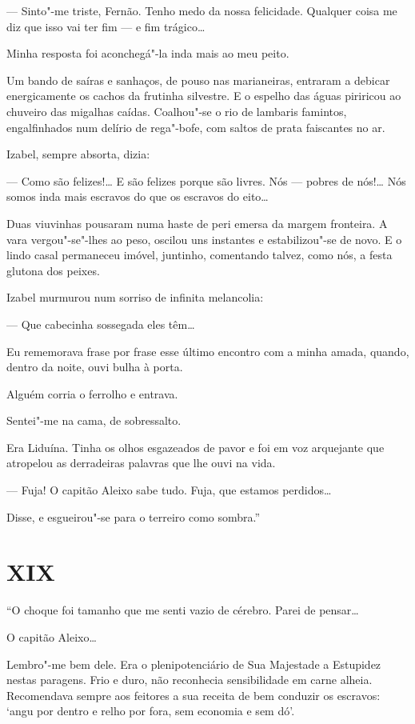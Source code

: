 --- Sinto"-me triste, Fernão. Tenho medo da nossa felicidade. Qualquer
coisa me diz que isso vai ter fim --- e fim trágico\ldots{}

Minha resposta foi aconchegá"-la inda mais ao meu peito.

Um bando de saíras e sanhaços, de pouso nas marianeiras, entraram a
debicar energicamente os cachos da frutinha silvestre. E o espelho das
águas piriricou ao chuveiro das migalhas caídas. Coalhou"-se o rio de
lambaris famintos, engalfinhados num delírio de rega"-bofe, com saltos de
prata faiscantes no ar.

Izabel, sempre absorta, dizia:

--- Como são felizes!\ldots{} E são felizes porque são livres. Nós --- pobres
de nós!\ldots{} Nós somos inda mais escravos do que os escravos do eito\ldots{}

Duas viuvinhas pousaram numa haste de peri emersa da margem fronteira. A
vara vergou"-se"-lhes ao peso, oscilou uns instantes e estabilizou"-se de
novo. E o lindo casal permaneceu imóvel, juntinho, comentando talvez,
como nós, a festa glutona dos peixes.

Izabel murmurou num sorriso de infinita melancolia:

--- Que cabecinha sossegada eles têm\ldots{}

Eu rememorava frase por frase esse último encontro com a minha amada,
quando, dentro da noite, ouvi bulha à porta.

Alguém corria o ferrolho e entrava.

Sentei"-me na cama, de sobressalto.

Era Liduína. Tinha os olhos esgazeados de pavor e foi em voz arquejante
que atropelou as derradeiras palavras que lhe ouvi na vida.

--- Fuja! O capitão Aleixo sabe tudo. Fuja, que estamos perdidos\ldots{}

Disse, e esgueirou"-se para o terreiro como sombra.''

\section*{XIX}

``O choque foi tamanho que me senti vazio de cérebro. Parei de pensar\ldots{}

O capitão Aleixo\ldots{}

Lembro"-me bem dele. Era o plenipotenciário de Sua Majestade a Estupidez
nestas paragens. Frio e duro, não reconhecia sensibilidade em carne
alheia. Recomendava sempre aos feitores a sua receita de bem conduzir os
escravos: `angu por dentro e relho por fora, sem economia e sem dó'.

